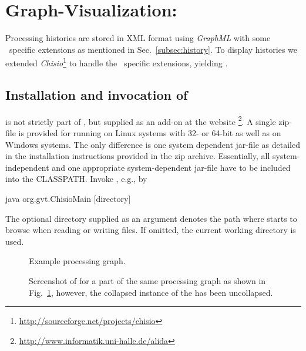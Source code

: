 \section{Graph-Visualization: \mtbc}
\label{app:chipory}

Processing histories are stored in XML format using {\em GraphML} with some
\alida\ specific extensions as mentioned in Sec.~\ref{subsec:history}.
To display histories we extended
{\em Chisio}\footnote{\href{http://sourceforge.net/projects/chisio}
{http://sourceforge.net/projects/chisio}} to handle the \alida\ specific
extensions, yielding \mtbc.

\subsection{Installation and invocation of \mtbc}

\mtbc is not strictly part of \alida, but supplied as an add-on
at the \alida website%
\footnote{\href{http://www.informatik.uni-halle.de/alida}{http://www.informatik.uni-halle.de/alida}}.
A single zip-file is provided for running \mtbc on Linux systems with 32- or
64-bit as well as on Windows systems. The only difference is one system
dependent jar-file as detailed in the installation instructions provided in the zip archive.
Essentially, all system-independent and one appropriate system-dependent
jar-file have to be included into the CLASSPATH.
Invoke \mtbc, e.g., by
\vspace*{0.5cm}
\begin{code}
  java org.gvt.ChisioMain [directory]
\end{code}

\vspace*{-0.25cm}
The optional directory supplied as an argument denotes the path where
\mtbc starts to browse when reading or writing files.
If omitted, the current working directory is used.

\begin{figure}[ht]
\centerline{}
\caption[Example of a processing graph.]{\label{fig:DAG-repeat}
Example processing graph.
}
\end{figure}

\begin{figure}
\begin{center}
{}
\caption{\label{fig:exa}Screenshot of \mtbc for a part of the same processing graph as shown in
Fig.~\ref{fig:DAG-repeat}, however, the collapsed instance of the
 has been uncollapsed.}
\end{center}
\end{figure}

